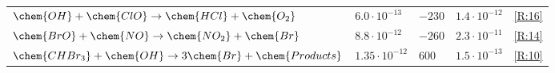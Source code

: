 \begin{table}[]
\begin{tabular}{|lllll|}
$\chem{OH} + \chem{ClO} \rightarrow \chem{HCl} + \chem{O_2}$         & $6.0\cdot10^{-13}$                     & $-230$                            & $1.4\cdot10^{-12}$                                                           & \ref{R:16}             \\
$\chem{BrO} + \chem{NO} \rightarrow \chem{NO_2} + \chem{Br}$         & $8.8\cdot10^{-12}$                     & $-260$                            & $2.3\cdot10^{-11}$                                                           & \ref{R:14}             \\
$\chem{CHBr_3} + \chem{OH} \rightarrow 3\chem{Br} + \chem{Products}$ & $1.35\cdot10^{-12}$                    & $600$                             & $1.5\cdot10^{-13}$                                                           & \ref{R:10}             \\ \hline
\end{tabular}
\caption{}
\label{tab:temp_dependent_react}
\end{table}